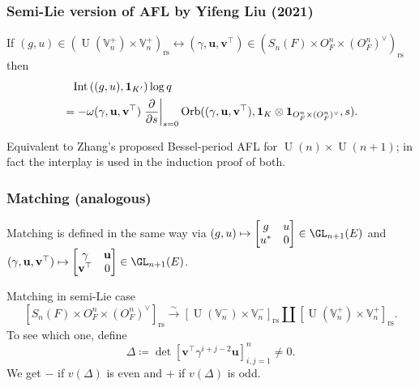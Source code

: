 \documentclass[11pt]{beamer}
\DeclareMathOperator{\Int}{Int}
\DeclareMathOperator{\Orb}{Orb}
\DeclareMathOperator{\U}{U}
\newcommand{\VV}{\mathbb{V}}
\renewcommand{\OO}{O}
\newcommand{\guv}{{(\gamma, \uu, \vv^\top)}}
\newcommand{\oneV}{\mathbf{1}_{\OO_F^n \times (\OO_F^n)^\vee}}
\newcommand{\rs}{_{\text{rs}}}
\newcommand{\uu}{\mathbf{u}}
\newcommand{\vv}{\mathbf{v}}
\begin{document}
\begin{frame}
  \frametitle{Semi-Lie version of AFL by Yifeng Liu (2021)}
  \begin{theorem}
    If $(g, u) \in (\U(\VV_n^+) \times \VV_n^+)\rs \longleftrightarrow
      (\gamma, \uu, \vv^\top) \in (S_n(F) \times \OO_F^n \times (\OO_F^n)^\vee)\rs$
    then
    \begin{align*}
      &\phantom= \Int\left( (g,u), \mathbf{1}_{K'} \right) \log q \\
      &= -\omega\guv \left. \pdv{}{s} \right\rvert_{s=0}
      \Orb(\guv, \mathbf{1}_K \otimes \oneV, s).
    \end{align*}
  \end{theorem}
  Equivalent to Zhang's proposed Bessel-period AFL for $\U(n) \times \U(n+1)$;
  in fact the interplay is used in the induction proof of both.
\end{frame}

\begin{frame}
  \frametitle{Matching (analogous)}
  Matching is defined in the same way via
  $(g,u) \mapsto \begin{bmatrix} g & u \\ u^\ast & 0 \end{bmatrix} \in \GL_{n+1}(E)$
  and $\guv \mapsto \begin{bmatrix} \gamma & \uu \\ \vv^\top & 0 \end{bmatrix} \in \GL_{n+1}(E)$.

  \begin{block}{Matching in semi-Lie case}
  \[ [S_n(F) \times \OO_F^n \times (\OO_F^n)^\vee]\rs \xrightarrow{\sim} [\U(\VV_n^-) \times \VV_n^-]\rs \amalg [\U(\VV_n^+) \times \VV_n^+]\rs. \]
  To see which one, define
  \[ \Delta \coloneqq \det \left[ \vv^\top \gamma^{i+j-2} \uu \right]_{i,j=1}^n \neq 0. \]
  We get $-$ if $v(\Delta)$ is even
  and $+$ if $v(\Delta)$ is odd.
  \end{block}
\end{frame}
\end{document}
